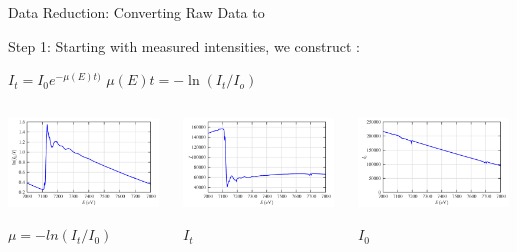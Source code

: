 \begin{slide}{Data Reduction: Converting Raw Data to  {\mue}  }

  \begin{cenpage}{145mm}
    Step 1:   Starting with measured intensities,  we construct {\mue}:
    
    \vmm\vmm

    {     {
    {}   $ I_t = I_0 e^{-\mu(E)t)}  $  \hspace{10mm}  $ \mu(E)t =  - \ln(I_t/I_o)  $
    
    \vmm
    \begin{columns}
      \begin{column}{40mm}
        \includegraphics[width=40mm]{figs/experiment/mu}
        
        \hspace{15mm}        $\mu = -ln(I_t/I_0)$
      \end{column}
      \begin{column}{40mm}         
        \includegraphics[width=40mm]{figs/experiment/i1}
        
        \hspace{15mm}        $I_t$
      \end{column}
      \begin{column}{40mm}                  
        \includegraphics[width=40mm]{figs/experiment/i0}
        
        \hspace{15mm}        $I_0$
       \end{column}
     \end{columns}

     \vmm
     
}}
\end{cenpage}
\end{slide}
